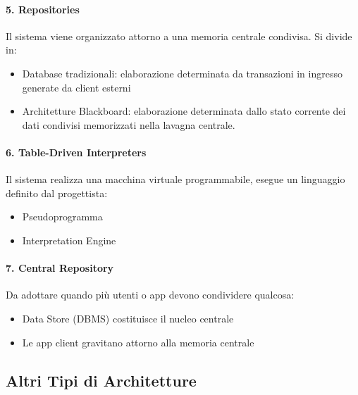 \documentclass[12pt]{extarticle}
\begin{document}
\paragraph{5. Repositories} Il sistema viene organizzato attorno a una memoria centrale condivisa. Si divide in:
\begin{itemize}
    \item Database tradizionali: elaborazione determinata da transazioni in ingresso generate da client esterni
    \item Architetture Blackboard: elaborazione determinata dallo stato corrente dei dati condivisi memorizzati nella lavagna centrale.
\end{itemize}

\paragraph{6. Table-Driven Interpreters} Il sistema realizza una macchina virtuale programmabile, esegue un linguaggio definito dal progettista:
\begin{itemize}
    \item Pseudoprogramma
    \item Interpretation Engine
\end{itemize}

\paragraph{7. Central Repository} Da adottare quando più utenti o app devono condividere qualcosa:
\begin{itemize}
    \item Data Store (DBMS) costituisce il nucleo centrale
    \item Le app client gravitano attorno alla memoria centrale
\end{itemize}

\newpage

\subsection{Altri Tipi di Architetture}
\end{document}
